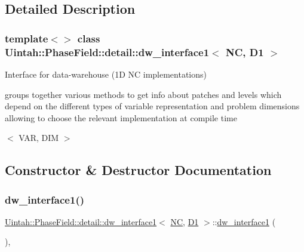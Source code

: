 \subsection{Detailed Description}
\subsubsection*{template$<$$>$\newline
class Uintah\+::\+Phase\+Field\+::detail\+::dw\+\_\+interface1$<$ N\+C, D1 $>$}

Interface for data-\/warehouse (1D NC implementations) 

groups together various methods to get info about patches and levels which depend on the different types of variable representation and problem dimensions allowing to choose the relevant implementation at compile time

$<$ V\+AR, D\+IM $>$ 

\subsection{Constructor \& Destructor Documentation}
\mbox{\label{classUintah_1_1PhaseField_1_1detail_1_1dw__interface1_3_01NC_00_01D1_01_4_a0d49c52d40faf4acf47836e49f844940}} 
\subsubsection{\texorpdfstring{dw\+\_\+interface1()}{dw\_interface1()}\hspace{0.1cm}{\footnotesize\ttfamily [1/2]}}
{\footnotesize\ttfamily \hyperlink{classUintah_1_1PhaseField_1_1detail_1_1dw__interface1}{Uintah\+::\+Phase\+Field\+::detail\+::dw\+\_\+interface1}$<$ \hyperlink{namespaceUintah_1_1PhaseField_a33d355affda78a83f45755ba8388cedda77924170fe82bfd58b74ca3e44139718}{NC}, \hyperlink{namespaceUintah_1_1PhaseField_a12bfc68444894dffdf0cb8d9cf0cc76aa24dcc0ba6bcb45bc6f503b1b538c6809}{D1} $>$\+::\hyperlink{classUintah_1_1PhaseField_1_1detail_1_1dw__interface1}{dw\+\_\+interface1} (\begin{DoxyParamCaption}{ }\end{DoxyParamCaption})\hspace{0.3cm}{\ttfamily [protected]}, {\ttfamily [delete]}}



